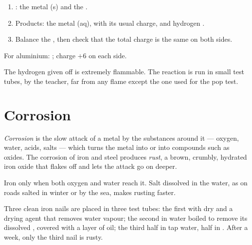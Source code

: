 \begin{method}\label{met:g9:metals-acids-corrosion:write}
\begin{enumerate}
  \item {}: the metal (s) and the  .
  \item Products: the metal  (aq), with its usual charge, and
        hydrogen .
  \item Balance the , then check that the total charge is the same
        on both sides.
\end{enumerate}
For aluminium: ; charge
$+6$ on each side.
\end{method}

\begin{safety}{}
The hydrogen given off is extremely flammable. The reaction is run in
small test tubes, by the teacher, far from any flame except the one used
for the pop test.
\end{safety}

\section{Corrosion}

\begin{definition}\label{def:g9:metals-acids-corrosion:corrosion}
\emph{Corrosion} is the slow attack of a metal by the
substances around it --- oxygen, water, acids, salts --- which turns the
metal into  or into compounds such as oxides. The corrosion of iron
and steel produces \emph{rust}, a brown, crumbly, hydrated
iron oxide that flakes off and lets the attack go on deeper.
\end{definition}

\begin{proposition}\label{prop:g9:metals-acids-corrosion:needs}
Iron  only when both oxygen and water reach it. Salt dissolved in
the water, as on roads salted in winter or by the sea, makes rusting
faster.
\end{proposition}

\begin{inthelab}
Three clean iron nails are placed in three test tubes: the first with
dry  and a drying agent that removes water vapour; the second in
water boiled to remove its dissolved , covered with a layer of oil;
the third half in tap water, half in . After a week, only the third
nail is rusty.
\end{inthelab}

